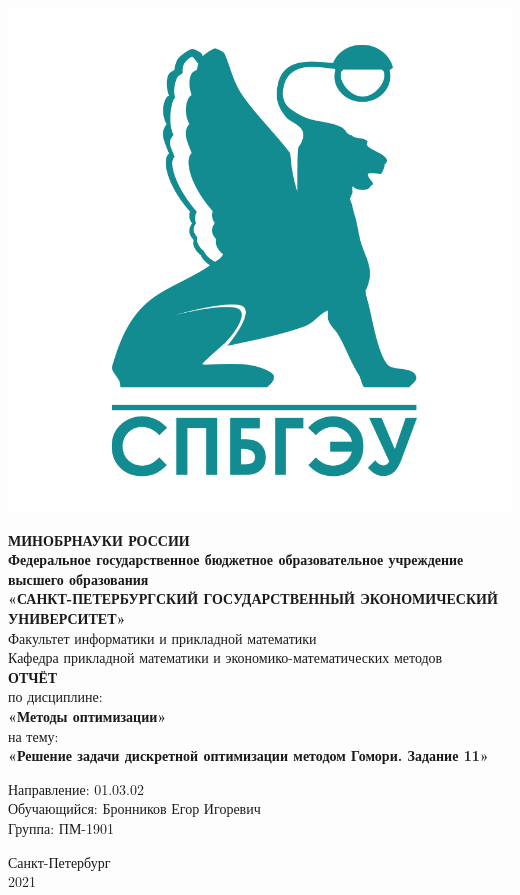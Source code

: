 \documentclass[14pt,a4paper,fleqn]{extarticle}
\begin{document}
	\begin{titlepage}
		\includegraphics[scale=0.12]{logo}
		\begin{center}
			\textbf{МИНОБРНАУКИ РОССИИ}\\
			\vspace{0.2cm}
			\textbf{Федеральное государственное бюджетное образовательное учреждение высшего образования}\\
			\textbf{«САНКТ-ПЕТЕРБУРГСКИЙ ГОСУДАРСТВЕННЫЙ ЭКОНОМИЧЕСКИЙ УНИВЕРСИТЕТ»}\\
			\vspace{0.6cm}
			Факультет информатики и прикладной математики\\
			Кафедра прикладной математики и экономико-математических методов\\
			\vspace{1cm}
			\textbf{ОТЧЁТ}\\
			по дисциплине:\\
			\textbf{«Методы оптимизации»}\\
			на тему:\\
			\textbf{«Решение задачи дискретной оптимизации методом Гомори. Задание 11»}\\
		\end{center}
		\vspace{1cm}
		Направление: 01.03.02\\
		Обучающийся: Бронников Егор Игоревич\\
		Группа: ПМ-1901\\
		\vfill
		\begin{center}
			Санкт-Петербург\\
			2021\\
		\end{center}
	\end{titlepage}
\end{document}
